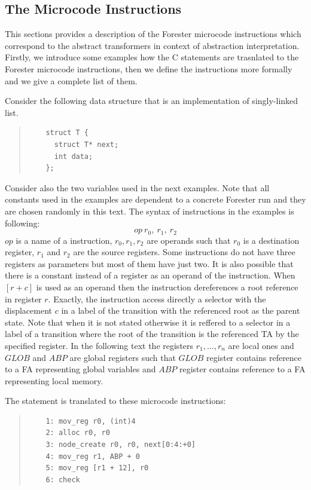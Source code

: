 \subsection{The Microcode Instructions}
\label{subsec:microinstr}

This sections provides a description of the Forester microcode instructions
which correspond to the abstract transformers in context of abstraction interpretation.
Firstly, we introduce some examples how the C statements are trasnlated
to the Forester microcode instructions, then we define the instructions
more formally and we give a complete list of them.

Consider the following data structure that is an implementation of singly-linked list.
	\begin{quote}
	\begin{verbatim}
	struct T {
      struct T* next;
      int data;
	};

	\end{verbatim}
	\end{quote}
	
	Consider also the two variables  used in the next examples.
	Note that all constants used in the examples are dependent to a concrete Forester
	run and they are chosen randomly in this text.
	The syntax of instructions in the examples is following:
	$$ op\ r_0,\ r_1,\ r_2$$
	$op$ is a name of a instruction,
	$r_0, r_1, r_2$ are operands such that $r_0$ is a destination register,
	$r_1$ and $r_2$ are the source registers.
	Some instructions do not have three registers as parameters but most of them
	have just two.
	It is also possible that there is a constant instead of a register
	as an operand of the instruction.
	When $[r+c]$ is used as an operand then the instruction dereferences a root reference in register $r$.
	Exactly, the instruction access directly a selector with the displacement $c$ in a label of the transition with
	the referenced root as the parent state.
	Note that when it is not stated otherwise it is reffered to a selector in a label of a transition
	where the root of the transition is the referenced TA by the specified register.
	In the following text the registers $r_1,\ldots,r_n$ are local ones and
	$GLOB$ and $ABP$ are global registers such that $GLOB$ register contains reference to a FA representing
	global variables and $ABP$ register contains reference to a FA representing local memory.

\bexmp
	The statement  is translated
	to these microcode instructions:
	\begin{quote}
	\begin{verbatim}
	1: mov_reg r0, (int)4
	2: alloc r0, r0
	3: node_create r0, r0, next[0:4:+0]
	4: mov_reg r1, ABP + 0
	5: mov_reg [r1 + 12], r0    
	6: check
	\end{verbatim}
	\end{quote}

